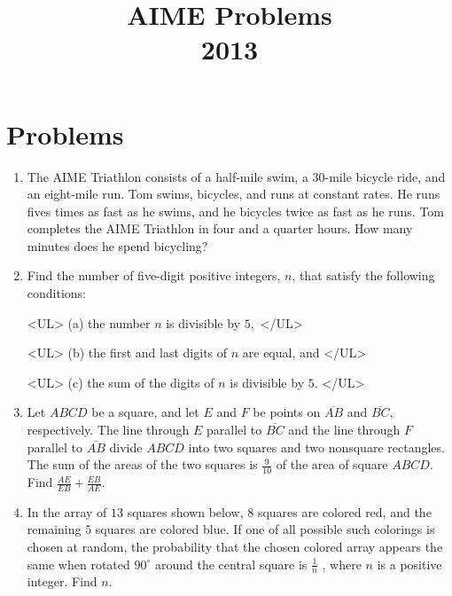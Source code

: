 \documentclass{article}
\title{AIME Problems \\ 2013}
\date{}
\begin{document}
\maketitle\thispagestyle{fancy}\newpage\section*{Problems}\begin{enumerate}[label=\arabic*., itemsep=0.5em]\item The AIME Triathlon consists of a half-mile swim, a 30-mile bicycle ride, and an eight-mile run. Tom swims, bicycles, and runs at constant rates. He runs fives times as fast as he swims, and he bicycles twice as fast as he runs. Tom completes the AIME Triathlon in four and a quarter hours. How many minutes does he spend bicycling?\par \vspace{0.5em}\item Find the number of five-digit positive integers, $n$, that satisfy the following conditions:

<UL>
(a) the number $n$ is divisible by $5,$
</UL>

<UL>
(b) the first and last digits of $n$ are equal, and
</UL>

<UL>
(c) the sum of the digits of $n$ is divisible by $5.$
</UL>\par \vspace{0.5em}\item Let $ABCD$ be a square, and let $E$ and $F$ be points on $\overline{AB}$ and $\overline{BC},$ respectively. The line through $E$ parallel to $\overline{BC}$ and the line through $F$ parallel to $\overline{AB}$ divide $ABCD$ into two squares and two nonsquare rectangles. The sum of the areas of the two squares is $\frac{9}{10}$ of the area of square $ABCD.$ Find $\frac{AE}{EB} + \frac{EB}{AE}.$\par \vspace{0.5em}\item In the array of $13$ squares shown below, $8$ squares are colored red, and the remaining $5$ squares are colored blue. If one of all possible such colorings is chosen at random, the probability that the chosen colored array appears the same when rotated $90^{\circ}$ around the central square is $\frac{1}{n}$ , where $n$ is a positive integer. Find $n$.



\end{enumerate}
\end{document}
